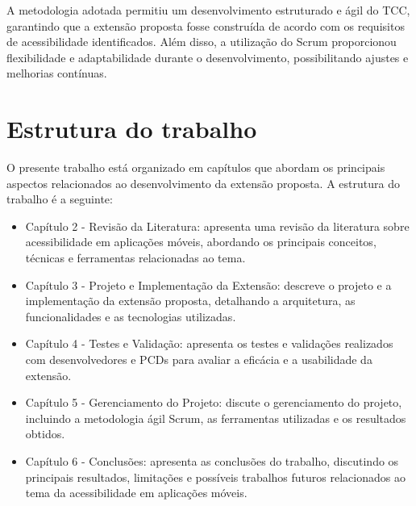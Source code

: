 A metodologia adotada permitiu um desenvolvimento estruturado e ágil do TCC, garantindo que a extensão proposta fosse construída de acordo com os requisitos de acessibilidade identificados. Além disso, a utilização do Scrum proporcionou flexibilidade e adaptabilidade durante o desenvolvimento, possibilitando ajustes e melhorias contínuas.

\section{Estrutura do trabalho}

O presente trabalho está organizado em capítulos que abordam os principais aspectos relacionados ao desenvolvimento da extensão proposta. A estrutura do trabalho é a seguinte:

\begin{itemize}
	\item Capítulo 2 - Revisão da Literatura: apresenta uma revisão da literatura sobre acessibilidade em aplicações móveis, abordando os principais conceitos, técnicas e ferramentas relacionadas ao tema.
	\item Capítulo 3 - Projeto e Implementação da Extensão: descreve o projeto e a implementação da extensão proposta, detalhando a arquitetura, as funcionalidades e as tecnologias utilizadas.
	\item Capítulo 4 - Testes e Validação: apresenta os testes e validações realizados com desenvolvedores e PCDs para avaliar a eficácia e a usabilidade da extensão.
	\item Capítulo 5 - Gerenciamento do Projeto: discute o gerenciamento do projeto, incluindo a metodologia ágil Scrum, as ferramentas utilizadas e os resultados obtidos.
	\item Capítulo 6 - Conclusões: apresenta as conclusões do trabalho, discutindo os principais resultados, limitações e possíveis trabalhos futuros relacionados ao tema da acessibilidade em aplicações móveis.
\end{itemize}